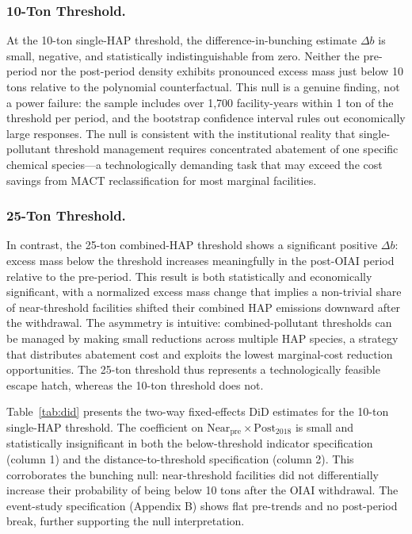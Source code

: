 \documentclass[12pt]{article}
\begin{document}
\subsubsection*{10-Ton Threshold.}
At the 10-ton single-HAP threshold, the difference-in-bunching estimate $\Delta b$ is small, negative, and statistically indistinguishable from zero. Neither the pre-period nor the post-period density exhibits pronounced excess mass just below 10 tons relative to the polynomial counterfactual. This null is a genuine finding, not a power failure: the sample includes over 1,700 facility-years within 1 ton of the threshold per period, and the bootstrap confidence interval rules out economically large responses. The null is consistent with the institutional reality that single-pollutant threshold management requires concentrated abatement of one specific chemical species---a technologically demanding task that may exceed the cost savings from MACT reclassification for most marginal facilities.

\subsubsection*{25-Ton Threshold.}
In contrast, the 25-ton combined-HAP threshold shows a significant positive $\Delta b$: excess mass below the threshold increases meaningfully in the post-OIAI period relative to the pre-period. This result is both statistically and economically significant, with a normalized excess mass change that implies a non-trivial share of near-threshold facilities shifted their combined HAP emissions downward after the withdrawal. The asymmetry is intuitive: combined-pollutant thresholds can be managed by making small reductions across multiple HAP species, a strategy that distributes abatement cost and exploits the lowest marginal-cost reduction opportunities. The 25-ton threshold thus represents a technologically feasible escape hatch, whereas the 10-ton threshold does not.

Table~\ref{tab:did} presents the two-way fixed-effects DiD estimates for the 10-ton single-HAP threshold. The coefficient on $\text{Near}_{\text{pre}} \times \text{Post}_{2018}$ is small and statistically insignificant in both the below-threshold indicator specification (column 1) and the distance-to-threshold specification (column 2). This corroborates the bunching null: near-threshold facilities did not differentially increase their probability of being below 10 tons after the OIAI withdrawal. The event-study specification (Appendix B) shows flat pre-trends and no post-period break, further supporting the null interpretation.
\end{document}
